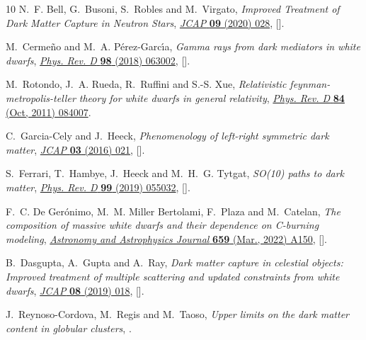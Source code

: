 \documentclass[11pt]{article}
\begin{document}
\begin{thebibliography}{10}
N.~F. Bell, G.~Busoni, S.~Robles and M.~Virgato, \emph{{Improved Treatment of
  Dark Matter Capture in Neutron Stars}},
  \href{https://doi.org/10.1088/1475-7516/2020/09/028}{\emph{JCAP} {\bfseries
  09} (2020) 028}, [\href{https://arxiv.org/abs/2004.14888}{{}}].

M.~Cerme\~no and M.~A. P\'erez-Garc\'\i{}a, \emph{{Gamma rays from dark
  mediators in white dwarfs}},
  \href{https://doi.org/10.1103/PhysRevD.98.063002}{\emph{Phys. Rev. D}
  {\bfseries 98} (2018) 063002},
  [\href{https://arxiv.org/abs/1807.03318}{{}}].

M.~Rotondo, J.~A. Rueda, R.~Ruffini and S.-S. Xue, \emph{Relativistic
  feynman-metropolis-teller theory for white dwarfs in general relativity},
  \href{https://doi.org/10.1103/PhysRevD.84.084007}{\emph{Phys. Rev. D}
  {\bfseries 84} (Oct, 2011) 084007}.

C.~Garcia-Cely and J.~Heeck, \emph{{Phenomenology of left-right symmetric dark
  matter}}, \href{https://doi.org/10.1088/1475-7516/2016/03/021}{\emph{JCAP}
  {\bfseries 03} (2016) 021},
  [\href{https://arxiv.org/abs/1512.03332}{{}}].

S.~Ferrari, T.~Hambye, J.~Heeck and M.~H.~G. Tytgat, \emph{{SO(10) paths to
  dark matter}}, \href{https://doi.org/10.1103/PhysRevD.99.055032}{\emph{Phys.
  Rev. D} {\bfseries 99} (2019) 055032},
  [\href{https://arxiv.org/abs/1811.07910}{{}}].

F.~C. {De Ger{\'o}nimo}, M.~M. {Miller Bertolami}, F.~{Plaza} and M.~{Catelan},
  \emph{{The composition of massive white dwarfs and their dependence on
  C-burning modeling}},
  \href{https://doi.org/10.1051/0004-6361/202142341}{\emph{Astronomy and
  Astrophysics Journal} {\bfseries 659} (Mar., 2022) A150},
  [\href{https://arxiv.org/abs/2201.08696}{{}}].

B.~Dasgupta, A.~Gupta and A.~Ray, \emph{{Dark matter capture in celestial
  objects: Improved treatment of multiple scattering and updated constraints
  from white dwarfs}},
  \href{https://doi.org/10.1088/1475-7516/2019/08/018}{\emph{JCAP} {\bfseries
  08} (2019) 018}, [\href{https://arxiv.org/abs/1906.04204}{{}}].

J.~Reynoso-Cordova, M.~Regis and M.~Taoso, \emph{{Upper limits on the dark
  matter content in globular clusters}},
  \href{https://arxiv.org/abs/2203.13735}{{}}.


\end{thebibliography}
\end{document}
